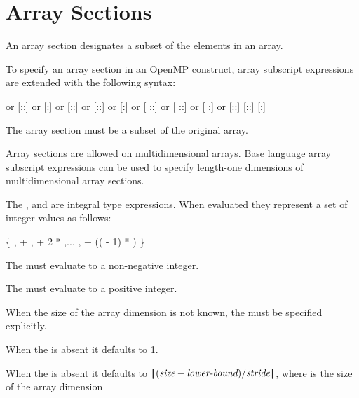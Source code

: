 \section{Array Sections}
\label{sec:Array Sections}

An array section designates a subset of the elements in an array.

\begin{ccppspecific}

To specify an array section in an OpenMP construct, array subscript expressions are
extended with the following syntax:

\begin{indentedcodelist}
 \textnormal{or}
[::\plc{ }] \textnormal{or}
[:] \textnormal{or}
[:\plc{ }:] \textnormal{or}
[:\plc{ }:\plc{ }] \textnormal{or}
[:\plc{ }] \textnormal{or}
[ ::] \textnormal{or}
[ ::\plc{ }] \textnormal{or}
[ :] \textnormal{or}
[\plc{ }:\plc{ }:]
[\plc{ }:\plc{ }:\plc{ }]
[\plc{ }:\plc{ }]
\end{indentedcodelist}

The array section must be a subset of the original array.

Array sections are allowed on multidimensional arrays. Base language array subscript
expressions can be used to specify length-one dimensions of multidimensional array
sections.

The ,  and  are integral type
expressions. When evaluated they represent a set of integer values as follows:

\{ ,  + ,  + 2 * ,... ,  + (( - 1) * ) \}

The  must evaluate to a non-negative integer.

The  must evaluate to a positive integer.

When the size of the array dimension is not known, the  must
be specified explicitly.

When the  is absent it defaults to 1.

When the  is absent it defaults to
$\blceil(\plc{size} - \plc{lower-bound})/\plc{stride}\brceil$, where  is
the size of the array dimension


\end{ccppspecific}
